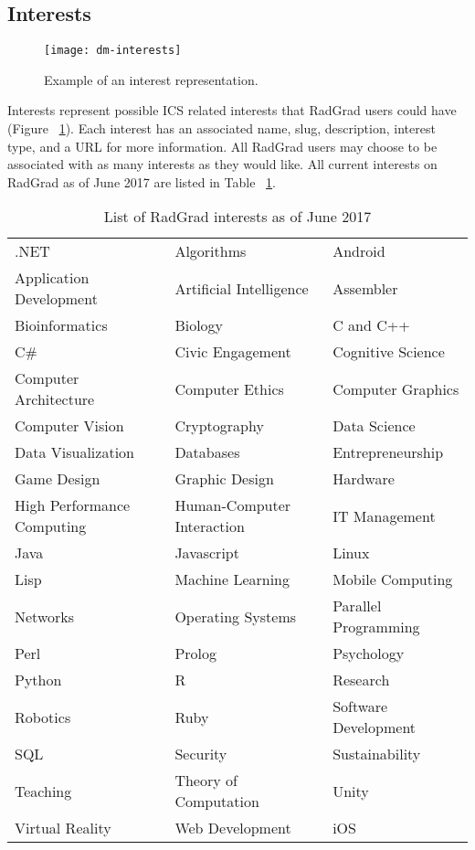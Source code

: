 \subsection{Interests}
\begin{figure}[htbp!]
\centering
\texttt{[image: dm-interests]}
\caption{Example of an interest representation.}
\label{interests}
\end{figure}
Interests represent possible ICS related interests that RadGrad users could have (Figure ~\ref{interests}). Each interest has an associated name, slug, description, interest type, and a URL for more information. All RadGrad users may choose to be associated with as many interests as they would like. All current interests on RadGrad as of June 2017 are listed in Table ~\ref{table:interests}.

\begin{table}[htbp!]
\centering
\begin{tabular}{ l l l } 
.NET & Algorithms & Android \\ 
Application Development & Artificial Intelligence & Assembler \\
Bioinformatics & Biology & C and C++ \\
C\# & Civic Engagement & Cognitive Science \\
Computer Architecture & Computer Ethics & Computer Graphics \\
Computer Vision & Cryptography & Data Science \\
Data Visualization & Databases & Entrepreneurship \\
Game Design & Graphic Design & Hardware \\
High Performance Computing & Human-Computer Interaction & IT Management \\
Java & Javascript & Linux \\
Lisp & Machine Learning & Mobile Computing \\
Networks & Operating Systems & Parallel Programming \\
Perl & Prolog & Psychology \\
Python & R & Research \\
Robotics & Ruby & Software Development \\
SQL & Security & Sustainability \\
Teaching & Theory of Computation & Unity \\
Virtual Reality & Web Development & iOS
\end{tabular}
\caption{List of RadGrad interests as of June 2017}
\label{table:interests}
\end{table}

